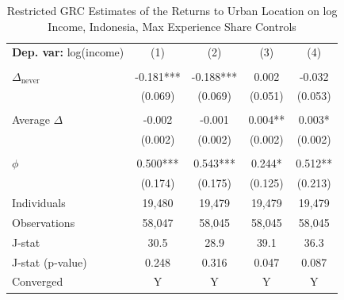 \begin{table}[htbp] \centering \begin{threeparttable}
 \caption{Restricted GRC Estimates of the Returns to Urban Location on log Income, Indonesia, Max Experience Share Controls} 
 \label{tab:GRC_IDN_income_urban_unb_exp_m_sh} 
\begin{tabular}{l cccc} \toprule  \textbf{Dep. var:}  log(income) 
                    &\multicolumn{1}{c}{(1)}   &\multicolumn{1}{c}{(2)}   &\multicolumn{1}{c}{(3)}   &\multicolumn{1}{c}{(4)}   \\
                    &               &               &               &               \\
\addlinespace
$\Delta_{\text{never}}$&      -0.181***&      -0.188***&       0.002   &      -0.032   \\
                    &     (0.069)   &     (0.069)   &     (0.051)   &     (0.053)   \\
                    &               &               &               &               \\
\addlinespace
Average $\Delta$    &      -0.002   &      -0.001   &       0.004** &       0.003*  \\
                    &     (0.002)   &     (0.002)   &     (0.002)   &     (0.002)   \\
                    &               &               &               &               \\
\addlinespace
$\phi$              &       0.500***&       0.543***&       0.244*  &       0.512** \\
                    &     (0.174)   &     (0.175)   &     (0.125)   &     (0.213)   \\
\addlinespace
Individuals         &      19,480   &      19,479   &      19,479   &      19,479   \\
Observations        &      58,047   &      58,045   &      58,045   &      58,045   \\
J-stat              &        30.5   &        28.9   &        39.1   &        36.3   \\
J-stat (p-value)    &       0.248   &       0.316   &       0.047   &       0.087   \\
Converged           &           Y   &           Y   &           Y   &           Y   \\

\end{tabular}
\end{threeparttable}
\end{table}
